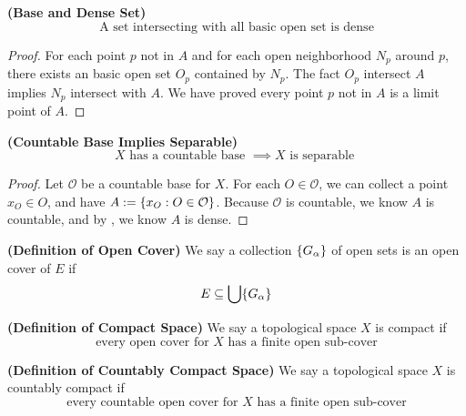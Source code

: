 \documentclass{report}
\begin{document}
\begin{theorem}
\label{0.3.4}
\textbf{(Base and Dense Set)} 
\begin{equation}
\text{ A set intersecting with all basic open set is dense }
\end{equation}
\end{theorem}
\begin{proof}
For each point $p$ not in $A$ and for each open neighborhood $N_p$ around $p$, there exists an basic open set  $O_p$ contained by $N_p$. The fact  $O_p$ intersect $A$ implies  $N_p$ intersect with  $A$. We have proved every point  $p$ not in $A $ is a limit point of $A$.
\end{proof}
\begin{corollary}
\label{0.3.5}
\textbf{(Countable Base Implies Separable)} 
\begin{equation}
X\text{ has a countable base }\implies X\text{ is separable }
\end{equation}
\end{corollary}
\begin{proof}
Let $\mathcal{O}$ be a countable base for $X$. For each $O\in \mathcal{O}$, we can collect a point $x_O\in O$, and have $A:=\{ x_O:O\in \mathcal{O} \}$. Because $\mathcal{O}$ is countable, we know $A$ is countable, and by  , we know $A$ is dense.
\end{proof}
\begin{definition}
\label{0.3.6}
\textbf{(Definition of Open Cover)} We say a collection $\{ G_\alpha   \}$ of open sets is an open cover of $E$ if 
\begin{equation}
E\subseteq \bigcup \{ G_\alpha  \}
\end{equation}
\end{definition}
\begin{definition}
\label{0.3.7}
\textbf{(Definition of Compact Space)} We say a topological space $X$ is compact if  
\begin{equation}
\text{every open cover for $X$ has a finite open sub-cover}
\end{equation}
\end{definition}
\begin{definition}
\label{0.3.8}
\textbf{(Definition of Countably Compact Space)} We say a topological space $X$ is countably compact if 
\begin{equation}
\text{every countable open cover for $X$ has a finite open sub-cover}
\end{equation}
\end{definition}
\end{document}
